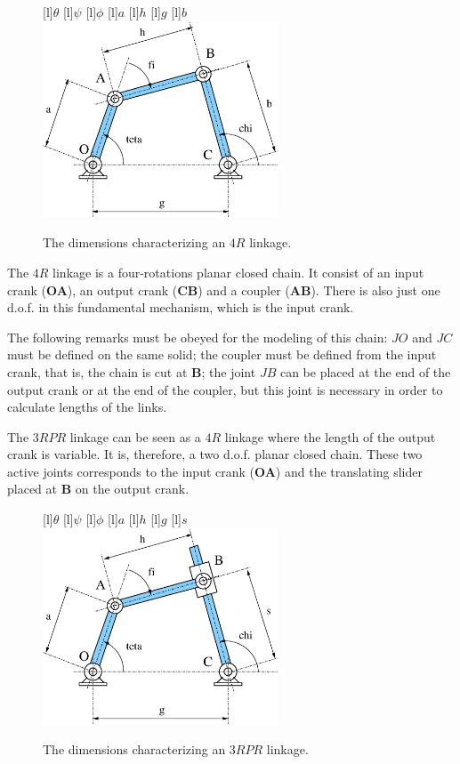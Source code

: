 \begin{figure}[ht!]
\begin{center}
[l]{$\theta$} 
[l]{$\psi$}
[l]{$\phi$}
[l]{$a$}
[l]{$h$}
[l]{$g$}
[l]{$b$}
 \includegraphics[width=7.0cm]{FIG/Constraint/4R.eps}
\end{center}
\caption{\label{fig:4R} The dimensions characterizing an $4R$ linkage.}
\end{figure}

The $4R$ linkage is a four-rotations planar closed chain. It consist
of an input crank ({\bf OA}), an output crank ({\bf CB}) and a coupler 
({\bf AB}). There is also just one d.o.f. in this fundamental mechanism,
which is the input crank.  

The following remarks must be obeyed for the modeling of this chain:
$JO$ and $JC$ must be defined on the same solid; the coupler must be
defined from the input crank, that is, the chain is cut at {\bf B};
the joint $JB$ can be placed at the end of the output crank or at the
end of the coupler, but this joint is necessary in order to calculate
lengths of the links.

The $3RPR$ linkage can be seen as a $4R$ linkage where the length of
the output crank is variable. It is, therefore, a two d.o.f. planar
closed chain. These two active joints corresponds to the input crank
({\bf OA}) and the translating slider placed at {\bf B} on the output
crank. 

\begin{figure}[ht!]
\begin{center}
[l]{$\theta$} 
[l]{$\psi$}
[l]{$\phi$}
[l]{$a$}
[l]{$h$}
[l]{$g$}
[l]{$s$}
 \includegraphics[width=7.0cm]{FIG/Constraint/3RPR.eps}
\end{center}
\caption{\label{fig:3RPR} The dimensions characterizing an $3RPR$ linkage.}
\end{figure}

